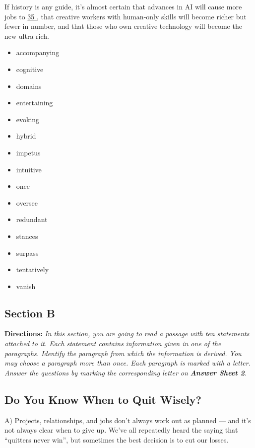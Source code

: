 \documentclass[UTF8,11pt]{ctexart}
\begin{document}
If history is any guide, it’s almost certain that advances in AI will cause more jobs to \uline{35 }, that creative workers with human-only skills will become richer but fewer in number, and that those who own creative technology will become the new ultra-rich.


\begin{itemize}[leftmargin=2em,itemsep=.2em,topsep=.4em]\item[A.] accompanying
\item[B.] cognitive
\item[C.] domains
\item[D.] entertaining
\item[E.] evoking
\item[F.] hybrid
\item[G.] impetus
\item[H.] intuitive
\item[I.] once
\item[J.] oversee
\item[K.] redundant
\item[L.] stances
\item[M.] surpass
\item[N.] tentatively
\item[O.] vanish
\end{itemize}

\subsection*{\textbf{Section B}}


\textbf{Directions:} \textit{In this section, you are going to read a passage with ten statements attached to it. Each statement contains} \textit{information given in one of the paragraphs. Identify the paragraph from which the information is derived. You may} \textit{choose a paragraph more than once. Each paragraph is marked with a letter. Answer the questions by marking the} \textit{corresponding letter on }\textbf{\textit{Answer Sheet 2}}\textit{.}


\subsection*{\textbf{Do You Know When to Quit Wisely?}}


A) Projects, relationships, and jobs don’t always work out as planned — and it’s not always clear when to give up. We’ve all repeatedly heard the saying that “quitters never win”, but sometimes the best decision is to cut our losses.
\end{document}

